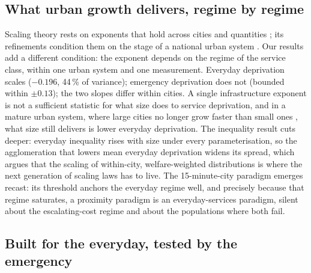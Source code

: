 \documentclass[9pt,twocolumn]{article}
\begin{document}
\subsection*{What urban growth delivers, regime by regime}

Scaling theory rests on exponents that hold across cities and quantities
\citep{bettencourt2007growth,bettencourt2013origins}; its refinements
condition them on the stage of a national urban system
\citep{musso2026cities}. Our results add a different condition: the
exponent depends on the regime of the service class, within one urban
system and one measurement. Everyday deprivation scales ($-0.196$,
44\,\% of variance); emergency deprivation does not (bounded within
$\pm 0.13$); the two slopes differ within cities. A single infrastructure
exponent is not a sufficient statistic for what size does to service
deprivation, and in a mature urban system, where large cities no longer
grow faster than small ones \citep{musso2026cities}, what size still
delivers is lower everyday deprivation. The inequality result cuts
deeper: everyday inequality rises with size under every parameterisation,
so the agglomeration that lowers mean everyday deprivation widens its
spread, which argues that the scaling of within-city, welfare-weighted
distributions is where the next generation of scaling laws has to live.
The 15-minute-city paradigm \citep{moreno2021fifteenminute,allam2022fifteenminute}
emerges recast: its threshold anchors the everyday regime well, and
precisely because that regime saturates, a proximity paradigm is an
everyday-services paradigm, silent about the escalating-cost regime and
about the populations where both fail.

\subsection*{Built for the everyday, tested by the emergency}
\end{document}
